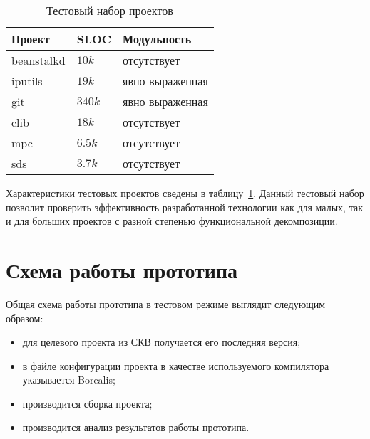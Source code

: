 \begin{table}
\caption{Тестовый набор проектов}
\begin{center}
\begin{tabular}{|l|l|l|}
\hline 
\textbf{Проект} & \textbf{SLOC} & \textbf{Модульность}  \\ 
\hline 
beanstalkd & $10k$ & отсутствует \\ 
\hline 
iputils & $19k$ & явно выраженная \\ 
\hline 
git & $340k$ & явно выраженная \\ 
\hline 
clib & $18k$ & отсутствует \\ 
\hline 
mpc & $6.5k$ & отсутствует \\ 
\hline 
sds & $3.7k$ & отсутствует \\ 
\hline 
\end{tabular} 
\end{center}
\label{table:testProjects}
\end{table}

Характеристики тестовых проектов сведены в таблицу~\ref{table:testProjects}. 
Дан­ный тестовый набор позволит проверить эффективность разработан­ной технологии 
как для малых, так и для больших проектов с разной степенью функциональной 
декомпозиции.

\section{Схема работы прототипа}
Общая схема работы прототипа в тестовом режиме выглядит сле­дующим образом:
\begin{itemize}
\item для целевого проекта из СКВ получается его последняя версия;
\item в файле конфигурации проекта в качестве используемого ком­пилятора 
указывается Borealis;
\item производится сборка проекта;
\item производится анализ результатов работы прототипа.
\end{itemize}

